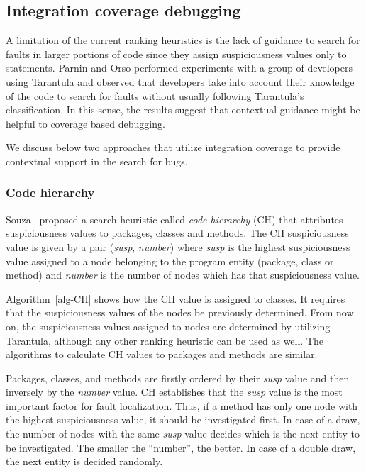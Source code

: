 \subsection{Integration coverage debugging}

A limitation of the current ranking heuristics is the lack of guidance to search
for faults in larger portions of code since they assign suspiciousness values
only to statements. Parnin and Orso \cite{parnin2011automated} performed experiments with
a group of developers using Tarantula and observed that  developers take into
account their knowledge of the code to search for faults without usually
following Tarantula's classification. In this sense, the results suggest that
contextual guidance might be helpful to coverage based debugging.

We discuss below two approaches that utilize integration coverage to provide
contextual support in the search for bugs.

\subsubsection{Code hierarchy}

Souza~\cite{souza2012depuracao} proposed a search heuristic called \textit{code
hierarchy} (CH) that attributes suspiciousness values to packages, classes and methods. The CH
suspiciousness value is given by a pair (\textit{susp}, \textit{number}) where
\textit{susp} is the highest suspiciousness value assigned to a node belonging
to the program entity (package, class or method) and \textit{number} is the
number of nodes which has that suspiciousness value.

Algorithm~\ref{alg-CH} shows how the CH value is assigned to classes. It
requires that the suspiciousness values of the nodes be previously determined.
From now on, the suspiciousness values assigned to nodes are determined by
utilizing Tarantula, although any other ranking heuristic
\cite{Wong2007,Abreu2007,gonzalez2007} can be used as well. The algorithms to
calculate CH values to packages and methods are similar.


Packages, classes, and methods are firstly ordered by their \textit{susp}
value and then inversely by the \textit{number} value. CH
establishes that the \textit{susp} value is the most important factor for fault
localization. Thus, if a method has only one node with the highest
suspiciousness value, it should be investigated first. In case of a draw, the
number of nodes with the same \textit{susp} value decides which is the next
entity to be investigated. The smaller the ``number'', the better. In case of a
double draw, the next entity is decided randomly.

